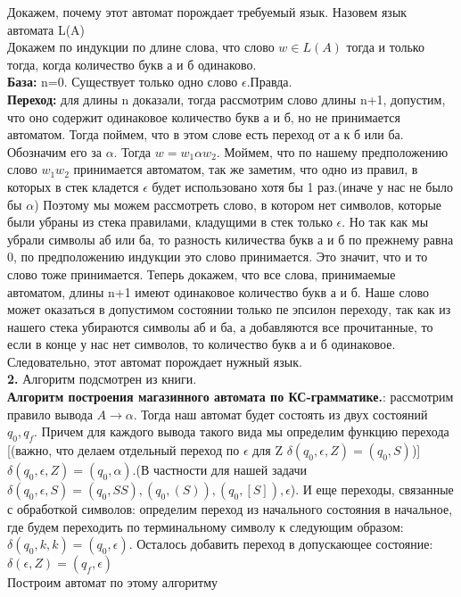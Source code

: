 \documentclass[a4paper,12pt]{article}
\begin{document}
Докажем, почему этот автомат порождает требуемый язык. Назовем язык автомата L(A)\\
Докажем по индукции по длине слова, что слово $w \in L(A)$ тогда и только тогда, когда количество букв а и б одинаково.\\
\textbf{База:} n=0. Существует только одно слово $\epsilon$.Правда.\\
\textbf{Переход:} для длины n доказали, тогда рассмотрим слово длины n+1, допустим, что оно содержит одинаковое количество букв а и б, но не принимается автоматом. Тогда поймем, что в этом слове есть переход от а к б или ба. Обозначим его за $\alpha$. Тогда $w=w_1\alpha w_2$. Моймем, что по нашему предположению слово $w_1w_2$ принимается автоматом, так же заметим, что одно из правил, в которых в стек кладется $\epsilon$ будет использовано хотя бы 1 раз.(иначе у нас не было бы $\alpha$) Поэтому мы можем рассмотреть слово, в котором нет символов, которые были убраны из стека правилами, кладущими в стек только $\epsilon$. Но так как мы убрали символы аб или ба, то разность киличества букв а и б по прежнему равна 0, по предположению индукции это слово принимается. Это значит, что и то слово тоже принимается. Теперь докажем, что все слова, принимаемые автоматом, длины n+1 имеют одинаковое количество букв а и б. Наше слово может оказаться в допустимом состоянии только пе эпсилон переходу, так как из нашего стека убираются символы аб и ба, а добавляются все прочитанные, то если в конце у нас нет символов, то количество букв а и б одинаковое.\\
Следовательно, этот автомат порождает нужный язык.\\
\textbf{2.}
Алгоритм подсмотрен из книги.\\
\textbf{Алгоритм построения магазинного автомата по КС-грамматике.}: рассмотрим правило вывода $A \to \alpha$. Тогда наш автомат будет состоять из двух состояний $q_0,q_f$.
Причем для каждого вывода такого вида мы определим функцию перехода [{(важно, что делаем отдельный переход по $\epsilon$ для Z $\delta (q_0,\epsilon,Z)=(q_0,S)$)}]  $\delta (q_0,\epsilon,Z)={(q_0,\alpha)}$.(В частности для нашей задачи 
$\delta(q_0,\epsilon,S)={(q_0,SS),(q_0,(S)),(q_0,[S]),\epsilon}$).
 И еще переходы, связанные с обработкой символов: определим переход из начального состояния в начальное, где будем переходить по терминальному символу к следующим образом: $\delta (q_0,k,k)=(q_0,\epsilon)$. Осталось добавить переход в допускающее состояние: $\delta (\epsilon,Z)=(q_f,\epsilon)$\\
 Построим автомат по этому алгоритму
\end{document}
